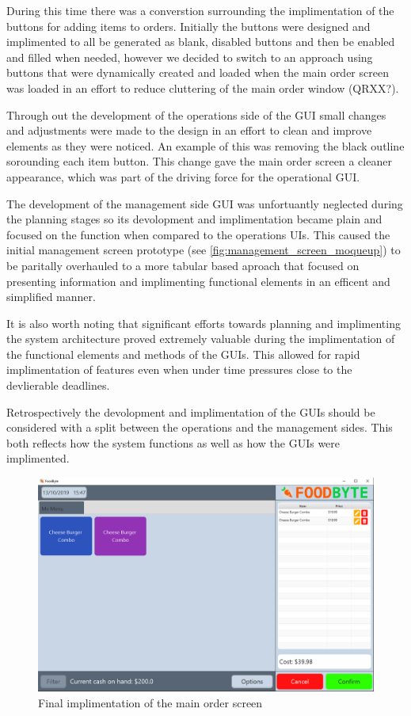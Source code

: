 During this time there was a converstion surrounding the implimentation of the buttons for adding items to orders. Initially the buttons were designed and implimented to all be generated as blank, disabled buttons and then be enabled and filled when needed, however we decided to switch to an approach using buttons that were dynamically created and loaded when the main order screen was loaded in an effort to reduce cluttering of the main order window (QRXX?).

Through out the development of the operations side of the GUI small changes and adjustments were made to the design in an effort to clean and improve elements as they were noticed. An example of this was removing the black outline sorounding each item button. This change gave the main order screen a cleaner appearance, which was part of the driving force for the operational GUI.

The development of the management side GUI was unfortuantly neglected during the planning stages so its devolopment and implimentation became plain and focused on the function when compared to the operations UIs. This caused the initial management screen prototype (see \ref{fig:management_screen_moqueup}) to be paritally overhauled to a more tabular based aproach that focused on presenting information and implimenting functional elements in an efficent and simplified manner.

It is also worth noting that significant efforts towards planning and implimenting the system architecture proved extremely valuable during the implimentation of the functional elements and methods of the GUIs. This allowed for rapid implimentation of features even when under time pressures close to the devlierable deadlines.

Retrospectively the devolopment and implimentation of the GUIs should be considered with a split between the operations and the management sides. This both reflects how the system functions as well as how the GUIs were implimented. 

\pagebreak

\begin{figure}[h]
	\centering
	\includegraphics[width=150mm]{images/Final_GUI/main_order_screen.png}
	\caption{Final implimentation of the main order screen}
	\label{fig:final_order_screen}
\end{figure}

